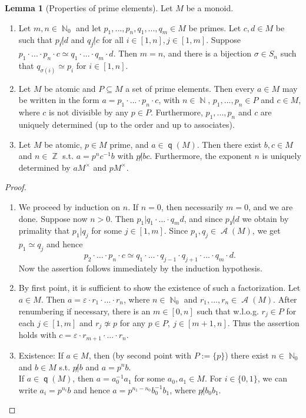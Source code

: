\documentclass[12pt,a4paper]{report}
\theoremstyle{definition}
\newtheorem{lemma}[theorem]{Lemma}
\theoremstyle{num.custom-title}
\DeclareMathOperator{\A}{\mathcal{A}}
\DeclareMathOperator{\N}{\mathbb{N}}
\DeclareMathOperator{\Z}{\mathbb{Z}}
\DeclareMathOperator{\sse}{\subseteq}
\DeclareMathOperator{\q}{\mathsf{q}}
\renewcommand{\epsilon}{\varepsilon}
\begin{document}
\begin{lemma}[Properties of prime elements]\label{prime_el_prop}
Let $M$ be a monoid.
\begin{enumerate}
\item Let $m,n \in \N_0$ and let $p_1,...,p_n,q_1,...,q_m \in M$ be primes. Let $c,d \in M$ be such that $p_i \not| d$ and $q_j \not| c$ for all $i \in [1,n], j \in [1,m]$. Suppose $p_1 \cdot ... \cdot p_n \cdot c \simeq q_1 \cdot ... \cdot q_m \cdot d$. Then $m=n$, and there is a bijection $\sigma \in S_n$ such that $q_{\sigma(i)} \simeq p_i$ for $i \in [1,n]$.
\item Let $M$ be atomic and $P \sse M$ a set of prime elements. Then every $a \in M$ may be written in the form $a=p_1 \cdot ... \cdot p_n \cdot c$, with $n \in \N$, $p_1,...,p_n \in P$ and $c \in M$, where $c$ is not divisible by any $p \in P$. Furthermore, $p_1,...,p_n$ and $c$ are uniquely determined (up to the order and up to associates).
\item Let $M$ be atomic, $p \in M$ prime, and $a \in \q(M)$. Then there exist $b,c \in M$ and $n \in \Z$ s.t. $a=p^n c^{-1} b$ with $p \not| bc$. Furthermore, the exponent $n$ is uniquely determined by $aM^\times$ and $pM^\times$.
\end{enumerate}
\begin{proof}\ 
\begin{enumerate}
\item We proceed by induction on $n$. If $n=0$, then necessarily $m=0$, and we are done. Suppose now $n>0$. Then $p_1 | q_1 \cdot ... \cdot q_m d$, and since $p_1 \not| d$ we obtain by primality that $p_1 | q_j$ for some $j \in [1,m]$. Since $p_1,q_j \in \A(M)$, we get $p_1 \simeq q_j$ and hence
\[
p_2 \cdot \ldots \cdot p_n \cdot c \simeq q_1 \cdot \ldots \cdot q_{j-1} \cdot q_{j+1} \cdot \ldots \cdot q_m \cdot d.
\]
Now the assertion follows immediately by the induction hypothesis.
\item By first point, it is sufficient to show the existence of such a factorization. Let $a \in M$. Then $a= \epsilon \cdot r_1 \cdot ... \cdot r_n$, where $n \in \N_0$ and $r_1,...,r_n \in \A(M)$. After renumbering if necessary, there is an $m \in [0,n]$ such that w.l.o.g. $r_j \in P$ for each $j \in [1,m]$ and $r_j \not\simeq p$ for any $p \in P, \ j \in [m+1,n]$. Thus the assertion holds with $c = \epsilon \cdot r_{m+1} \cdot ... \cdot r_n$.
\item Existence: If $a \in M$, then (by second point with $P:=\{p\}$) there exist $n \in \N_0$ and $b \in M$ s.t. $p \not| b$ and $a=p^nb$.\\
If $a \in \q(M)$, then $a=a_0^{-1} a_1$ for some $a_0,a_1 \in M$. For $i \in \{0,1\}$, we can write $a_i=p^{n_i} b$ and hence $a=p^{n_1-n_0} b_0^{-1} b_1$, where $p \not| b_0b_1$.


\end{enumerate}
\end{proof}
\end{lemma}
\end{document}

